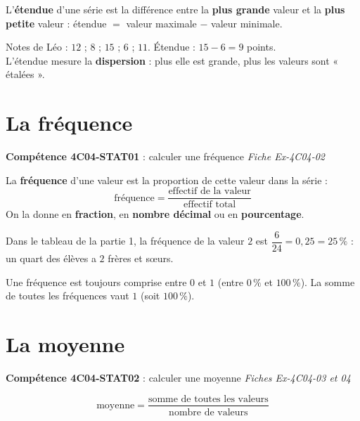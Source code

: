 \documentclass[11pt]{article}
\newcommand{\comp}[2]{\par\smallskip\noindent\colorbox{gray!15}{\parbox{\dimexpr\linewidth-2\fboxsep}{\small\textbf{Compétence #1} : #2}}\par\smallskip}
\newcommand{\f}[2]{\dfrac{#1}{#2}}
\begin{document}
\begin{definition}
L'\textbf{étendue} d'une série est la différence entre la \textbf{plus grande} valeur et la \textbf{plus petite} valeur :
\qquad étendue $=$ valeur maximale $-$ valeur minimale.
\end{definition}

\begin{exemple}
Notes de Léo : $12$ ; $8$ ; $15$ ; $6$ ; $11$. \quad Étendue : $15 - 6 = 9$ points.\\
L'étendue mesure la \textbf{dispersion} : plus elle est grande, plus les valeurs sont « étalées ».
\end{exemple}

\section{La fréquence}
\comp{4C04-STAT01}{calculer une fréquence \hfill \textit{Fiche Ex-4C04-02}}

\begin{definition}
La \textbf{fréquence} d'une valeur est la proportion de cette valeur dans la série :
\[ \text{fréquence} = \f{\text{effectif de la valeur}}{\text{effectif total}} \]
On la donne en \textbf{fraction}, en \textbf{nombre décimal} ou en \textbf{pourcentage}.
\end{definition}

\begin{exemple}
Dans le tableau de la partie 1, la fréquence de la valeur $2$ est
$\f{6}{24} = 0,25 = 25\,\%$ : un quart des élèves a $2$ frères et sœurs.
\end{exemple}

\begin{remarque}
Une fréquence est toujours comprise entre $0$ et $1$ (entre $0\,\%$ et $100\,\%$).
La somme de toutes les fréquences vaut $1$ (soit $100\,\%$).
\end{remarque}

\section{La moyenne}
\comp{4C04-STAT02}{calculer une moyenne \hfill \textit{Fiches Ex-4C04-03 et 04}}

\begin{definition}
\[ \text{moyenne} = \f{\text{somme de toutes les valeurs}}{\text{nombre de valeurs}} \]
\end{definition}
\end{document}
